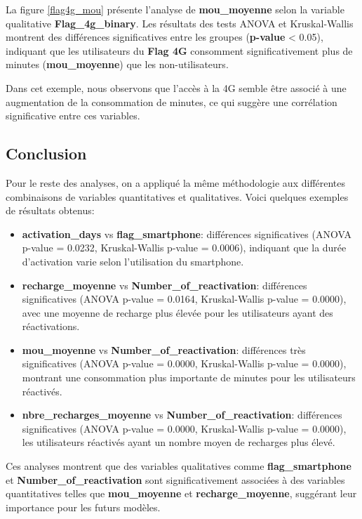 La figure \ref{flag4g_mou} présente l'analyse de \textbf{mou\_moyenne} selon la variable qualitative \textbf{Flag\_4g\_binary}. Les résultats des tests ANOVA et Kruskal-Wallis montrent des différences significatives entre les groupes (\textbf{p-value} < 0.05), indiquant que les utilisateurs du \textbf{Flag 4G} consomment significativement plus de minutes (\textbf{mou\_moyenne}) que les non-utilisateurs.

Dans cet exemple, nous observons que l'accès à la 4G semble être associé à une augmentation de la consommation de minutes, ce qui suggère une corrélation significative entre ces variables.

\subsection*{Conclusion }
Pour le reste des analyses, on a appliqué la même méthodologie aux différentes combinaisons de variables quantitatives et qualitatives. Voici quelques exemples de résultats obtenus:

\begin{itemize}
    \item \textbf{activation\_days} vs \textbf{flag\_smartphone}: différences significatives (ANOVA p-value = 0.0232, Kruskal-Wallis p-value = 0.0006), indiquant que la durée d'activation varie selon l'utilisation du smartphone.
    \item \textbf{recharge\_moyenne} vs \textbf{Number\_of\_reactivation}: différences significatives (ANOVA p-value = 0.0164, Kruskal-Wallis p-value = 0.0000), avec une moyenne de recharge plus élevée pour les utilisateurs ayant des réactivations.
    \item \textbf{mou\_moyenne} vs \textbf{Number\_of\_reactivation}: différences très significatives (ANOVA p-value = 0.0000, Kruskal-Wallis p-value = 0.0000), montrant une consommation plus importante de minutes pour les utilisateurs réactivés.
    \item \textbf{nbre\_recharges\_moyenne} vs \textbf{Number\_of\_reactivation}: différences significatives (ANOVA p-value = 0.0000, Kruskal-Wallis p-value = 0.0000), les utilisateurs réactivés ayant un nombre moyen de recharges plus élevé.
\end{itemize}

Ces analyses montrent que des variables qualitatives comme \textbf{flag\_smartphone} et \textbf{Number\_of\_reactivation} sont significativement associées à des variables quantitatives telles que \textbf{mou\_moyenne} et \textbf{recharge\_moyenne}, suggérant leur importance pour les futurs modèles.

